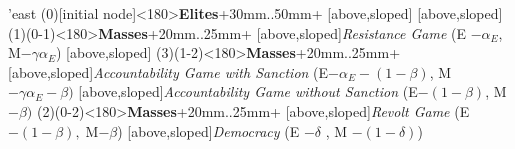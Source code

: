 	\begin{istgame}[font=\footnotesize]
	\centering
	\setistgrowdirection'{east}
	\xtShowArrows
	\istroot(0)[initial node]<180>{\textbf{Elites}}+30mm..50mm+
	[above,sloped]  [above,sloped] \endist
	\istroot(1)(0-1)<180>{\textbf{Masses}}+20mm..25mm+
	[above,sloped]{\textit{Resistance Game} (E $- \alpha_{E}$, M$-\gamma\alpha_{E}$) }
	[above,sloped]{ }  \endist
	\istroot(3)(1-2)<180>{\textbf{Masses}}+20mm..25mm+
	[above,sloped]{\textit{Accountability Game with Sanction}
		(E$- \alpha_{E}- (1-\beta)$, M$-\gamma\alpha_{E}-\beta)$}
	[above,sloped]{\textit{Accountability Game without Sanction} 
		(E$-(1 - \beta)$, M$-\beta)$} \endist
	\istroot(2)(0-2)<180>{\textbf{Masses}}+20mm..25mm+
	[above,sloped]{\textit{Revolt Game} (E $- (1-\beta),\; $M$-\beta$)}
	[above,sloped]{\textit{Democracy} (E $-\delta$ , M $- (1-\delta)$)} \endist
\end{istgame}